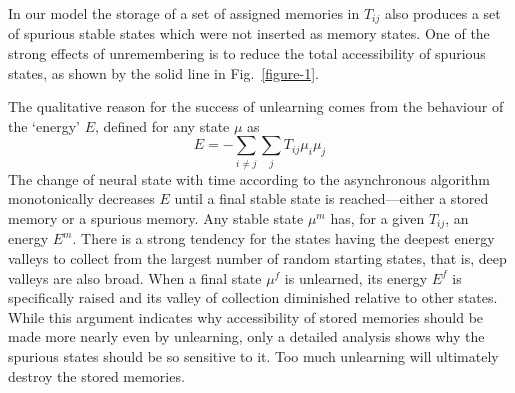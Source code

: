 \documentclass[11pt,letterpaper]{article}
\begin{document}
	In our model the storage of a set of assigned memories in $T_{ij}$ also produces a set of spurious stable states which were not inserted as memory states. One of the strong effects of unremembering is to reduce the total accessibility of spurious states, as shown by the solid line in Fig.~\ref{figure-1}.
	
	The qualitative reason for the success of unlearning comes from the behaviour of the `energy' $E$, defined for any state $\mu$ as
	\begin{equation}
		E=- \sum_{i \ne j} \sum_{j} T_{ij} \mu_{i} \mu_{j}
	\end{equation}
	The change of neural state with time according to the asynchronous algorithm monotonically decreases $E$ until a final stable state is reached---either a stored memory or a spurious memory. Any stable state $\mu^{m}$ has, for a given $T_{ij}$, an energy $E^{m}$. There is a strong tendency for the states having the deepest energy valleys to collect from the largest number of random starting states, that is, deep valleys are also broad. When a final state $\mu^{f}$ is unlearned, its energy $E^{f}$ is specifically raised and its valley of collection diminished relative to other states. While this argument indicates why accessibility of stored memories should be made more nearly even by unlearning, only a detailed analysis shows why the spurious states should be so sensitive to it. Too much unlearning will ultimately destroy the stored memories.
	
\end{document}
